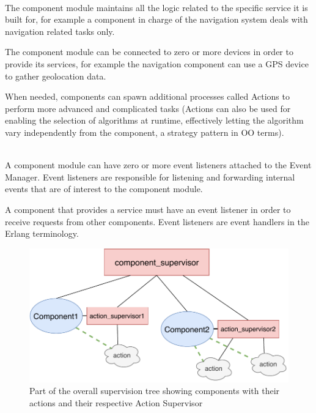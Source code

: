 \documentclass{memoir}
\begin{document}
\begin{description}
	\addtolength{\itemindent}{0.2cm}
	\item[The component module:] \hfill \\
The component module maintains all the logic related to the specific service it is built for, for example a component in charge of the navigation system deals with navigation related tasks only.

The component module can be connected to zero or more devices in order to provide its services, for example the navigation component can use a GPS device to gather geolocation data. 


When needed, components can spawn additional processes called Actions to perform more advanced and complicated tasks (Actions can also be used for enabling the selection of algorithms at runtime, effectively letting the algorithm vary independently from the component, a strategy pattern in OO terms).

	
	\item[The event Listener:] \hfill \\
A component module can have zero or more event listeners attached to the Event Manager. Event listeners are responsible for listening and forwarding internal events that are of interest to the component module.

A component that provides a service must have an event listener in order to receive requests from other components. Event listeners are event handlers in the Erlang terminology.
	
\end{description}

\begin{figure}
	\centering
	\includegraphics[width=0.7\linewidth]{implementation_details/component_and_action.pdf}
	\caption{Part of the overall supervision tree showing components with their actions and their respective Action Supervisor}
	\label{fig:component-and-action}
\end{figure}
\end{document}
